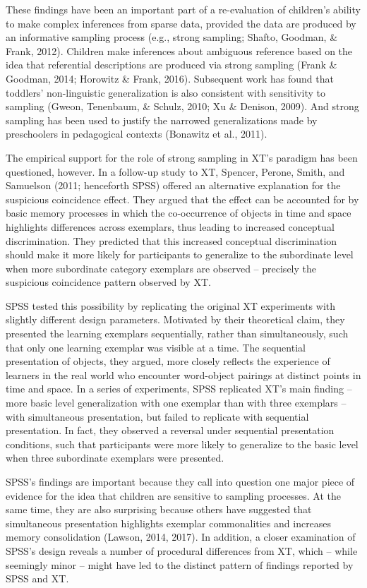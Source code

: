 \documentclass[english,floatsintext,man]{apa6}
\theoremstyle{definition}
\theoremstyle{definition}
\theoremstyle{remark}
\begin{document}
These findings have been an important part of a re-evaluation of
children's ability to make complex inferences from sparse data, provided
the data are produced by an informative sampling process (e.g., strong
sampling; Shafto, Goodman, \& Frank, 2012). Children make inferences
about ambiguous reference based on the idea that referential
descriptions are produced via strong sampling (Frank \& Goodman, 2014;
Horowitz \& Frank, 2016). Subsequent work has found that toddlers'
non-linguistic generalization is also consistent with sensitivity to
sampling (Gweon, Tenenbaum, \& Schulz, 2010; Xu \& Denison, 2009). And
strong sampling has been used to justify the narrowed generalizations
made by preschoolers in pedagogical contexts (Bonawitz et al., 2011).

The empirical support for the role of strong sampling in XT's paradigm
has been questioned, however. In a follow-up study to XT, Spencer,
Perone, Smith, and Samuelson (2011; henceforth SPSS) offered an
alternative explanation for the suspicious coincidence effect. They
argued that the effect can be accounted for by basic memory processes in
which the co-occurrence of objects in time and space highlights
differences across exemplars, thus leading to increased conceptual
discrimination. They predicted that this increased conceptual
discrimination should make it more likely for participants to generalize
to the subordinate level when more subordinate category exemplars are
observed -- precisely the suspicious coincidence pattern observed by XT.

SPSS tested this possibility by replicating the original XT experiments
with slightly different design parameters. Motivated by their
theoretical claim, they presented the learning exemplars sequentially,
rather than simultaneously, such that only one learning exemplar was
visible at a time. The sequential presentation of objects, they argued,
more closely reflects the experience of learners in the real world who
encounter word-object pairings at distinct points in time and space. In
a series of experiments, SPSS replicated XT's main finding -- more basic
level generalization with one exemplar than with three exemplars -- with
simultaneous presentation, but failed to replicate with sequential
presentation. In fact, they observed a reversal under sequential
presentation conditions, such that participants were more likely to
generalize to the basic level when three subordinate exemplars were
presented.

SPSS's findings are important because they call into question one major
piece of evidence for the idea that children are sensitive to sampling
processes. At the same time, they are also surprising because others
have suggested that simultaneous presentation highlights exemplar
commonalities and increases memory consolidation (Lawson, 2014, 2017).
In addition, a closer examination of SPSS's design reveals a number of
procedural differences from XT, which -- while seemingly minor -- might
have led to the distinct pattern of findings reported by SPSS and XT.
\end{document}

